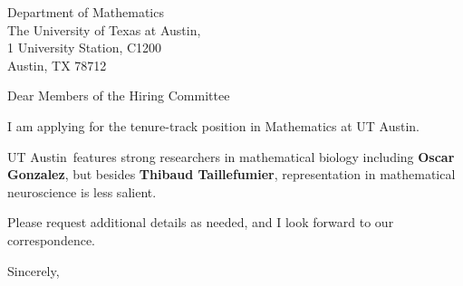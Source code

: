 




	
	
	\def\School{UT Austin}
	
	\begin{letter}
		{Department of Mathematics\\
			The University of Texas at Austin,\\
			1 University Station, C1200\\
			Austin, TX 78712
		}
		
		\opening{Dear Members of the Hiring Committee}
		
		
		I am applying for the tenure-track position in Mathematics at \School. 
		
		
		
		\School~features strong researchers in mathematical biology including \textbf{Oscar Gonzalez}, but besides \textbf{Thibaud Taillefumier}, representation in mathematical neuroscience is less salient. 
		
		
		
		
		
		Please request additional details as needed, and I look forward to our correspondence.
		
		\closing{Sincerely,}
	\end{letter}
